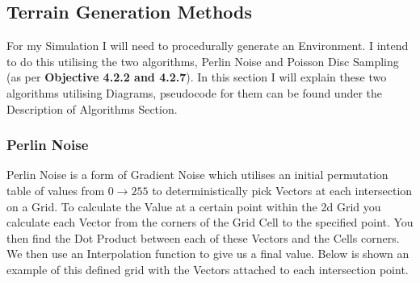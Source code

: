 \begin{flushleft}
        \subsection{Terrain Generation Methods}
            For my Simulation I will need to procedurally generate an Environment. I intend to do this utilising
            the two algorithms, Perlin Noise and Poisson Disc Sampling (as per \textbf{Objective 4.2.2 and 4.2.7}).
            In this section I will explain these two algorithms utilising Diagrams, pseudocode for them can be found under
            the Description of Algorithms Section.

            \subsubsection{Perlin Noise}
                Perlin Noise is a form of Gradient Noise which utilises an initial permutation table of values from $0\to 255$
                to deterministically pick Vectors at each intersection on a Grid. To calculate the Value at a certain point within
                the 2d Grid you calculate each Vector from the corners of the Grid Cell to the specified point. You then
                find the Dot Product between each of these Vectors and the Cells corners. We then use an Interpolation function
                to give us a final value. Below is shown an example of this defined grid with the Vectors attached to each intersection
                point. \\
                \vspace{0.5cm}

                \begin{center}
\end{center}
\end{flushleft}
